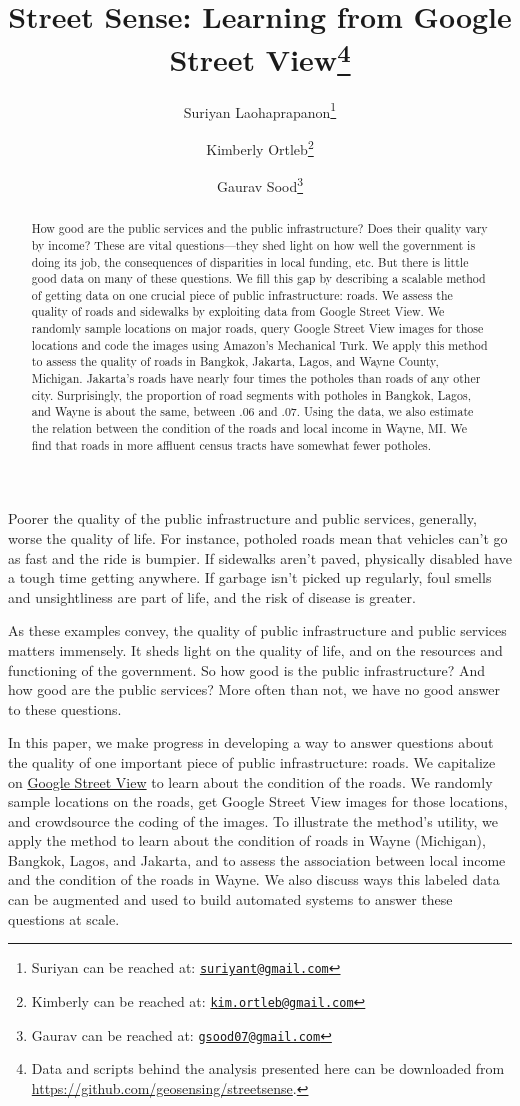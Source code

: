 \documentclass[12pt, letterpaper]{article}
\title{Street Sense: Learning from Google Street View\footnote{Data and scripts behind the analysis presented here can be downloaded from \url{https://github.com/geosensing/streetsense}.
}}
\author{Suriyan Laohaprapanon\thanks{Suriyan can be reached at: \href{mailto:suriyant@gmail.com}{\texttt{suriyant@gmail.com}}} \and Kimberly Ortleb\thanks{Kimberly can be reached at: \href{kim.ortleb@gmail.com}{\texttt{kim.ortleb@gmail.com}}} \and Gaurav Sood\thanks{Gaurav can be reached at: \href{gsood07@gmail.com}{\texttt{gsood07@gmail.com}}}}
\begin{document}
\maketitle
\thispagestyle{empty}

\begin{abstract}
How good are the public services and the public infrastructure? Does their quality vary by income? These are vital questions---they shed light on how well the government is doing its job, the consequences of disparities in local funding, etc. But there is little good data on many of these questions. We fill this gap by describing a scalable method of getting data on one crucial piece of public infrastructure: roads. We assess the quality of roads and sidewalks by exploiting data from Google Street View. We randomly sample locations on major roads, query Google Street View images for those locations and code the images using Amazon's Mechanical Turk. We apply this method to assess the quality of roads in Bangkok, Jakarta, Lagos, and Wayne County, Michigan. Jakarta's roads have nearly four times the potholes than roads of any other city. Surprisingly, the proportion of road segments with potholes in Bangkok, Lagos, and Wayne is about the same, between .06 and .07. Using the data, we also estimate the relation between the condition of the roads and local income in Wayne, MI. We find that roads in more affluent census tracts have somewhat fewer potholes.
\end{abstract}

\clearpage

\doublespacing

Poorer the quality of the public infrastructure and public services, generally, worse the quality of life. For instance, potholed roads mean that vehicles can't go as fast and the ride is bumpier. If sidewalks aren't paved, physically disabled have a tough time getting anywhere. If garbage isn't picked up regularly, foul smells and unsightliness are part of life, and the risk of disease is greater.  

As these examples convey, the quality of public infrastructure and public services matters immensely. It sheds light on the quality of life, and on the resources and functioning of the government. So how good is the public infrastructure? And how good are the public services? More often than not, we have no good answer to these questions.

In this paper, we make progress in developing a way to answer questions about the quality of one important piece of public infrastructure: roads. We capitalize on \href{https://www.google.com/streetview/}{Google Street View} to learn about the condition of the roads. We randomly sample locations on the roads, get Google Street View images for those locations, and crowdsource the coding of the images. To illustrate the method's utility, we apply the method to learn about the condition of roads in Wayne (Michigan), Bangkok, Lagos, and Jakarta, and to assess the association between local income and the condition of the roads in Wayne. We also discuss ways this labeled data can be augmented and used to build automated systems to answer these questions at scale.
\end{document}
